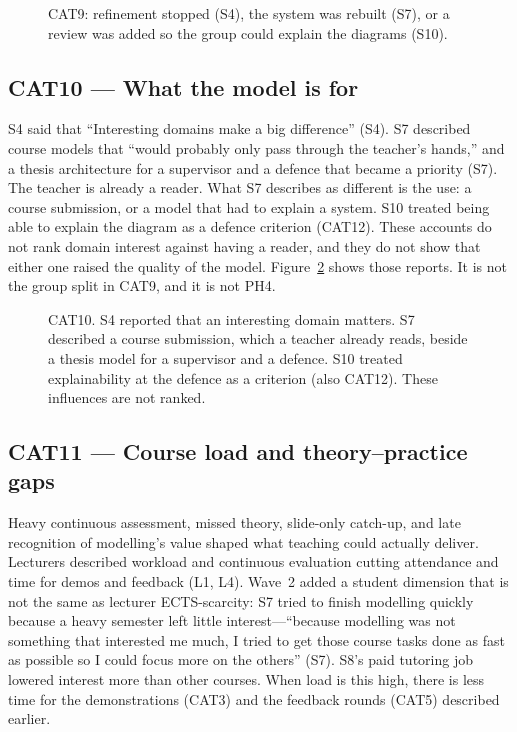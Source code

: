 \begin{figure}[htbp]
\centering

\caption{CAT9: refinement stopped (S4), the system was rebuilt (S7), or a review was added so the group could explain the diagrams (S10).}
\label{fig:cat9}
\end{figure}

\subsection{CAT10 --- What the model is for}
\label{sec:cat10}

S4 said that ``Interesting domains make a big difference'' (S4). S7 described course models that ``would probably only pass through the teacher's hands,'' and a thesis architecture for a supervisor and a defence that became a priority (S7). The teacher is already a reader. What S7 describes as different is the use: a course submission, or a model that had to explain a system. S10 treated being able to explain the diagram as a defence criterion (CAT12). These accounts do not rank domain interest against having a reader, and they do not show that either one raised the quality of the model. Figure~\ref{fig:cat10} shows those reports. It is not the group split in CAT9, and it is not PH4.

\begin{figure}[htbp]
\centering

\caption{CAT10. S4 reported that an interesting domain matters. S7 described a course submission, which a teacher already reads, beside a thesis model for a supervisor and a defence. S10 treated explainability at the defence as a criterion (also CAT12). These influences are not ranked.}
\label{fig:cat10}
\end{figure}

\subsection{CAT11 --- Course load and theory--practice gaps}
\label{sec:cat11}

Heavy continuous assessment, missed theory, slide-only catch-up, and late recognition of modelling's value shaped what teaching could actually deliver. Lecturers described workload and continuous evaluation cutting attendance and time for demos and feedback (L1, L4). Wave~2 added a student dimension that is not the same as lecturer ECTS-scarcity: S7 tried to finish modelling quickly because a heavy semester left little interest---``because modelling was not something that interested me much, I tried to get those course tasks done as fast as possible so I could focus more on the others'' (S7). S8's paid tutoring job lowered interest more than other courses. When load is this high, there is less time for the demonstrations (CAT3) and the feedback rounds (CAT5) described earlier.

